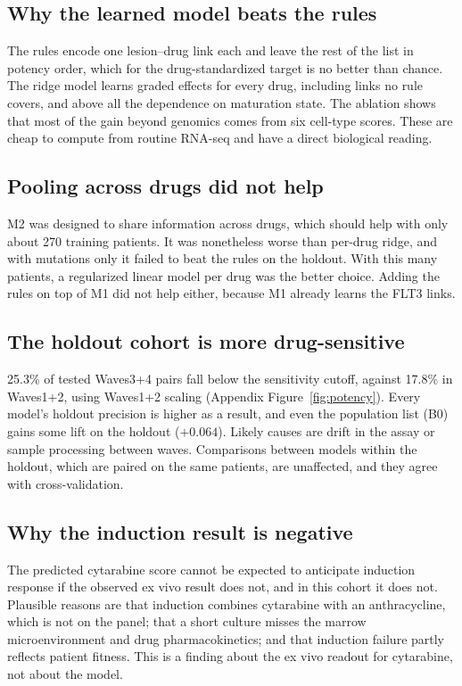 \documentclass[11pt,logo,nonumbering]{preprint}
\begin{document}
\subsection{Why the learned model beats the rules}
The rules encode one lesion--drug link each and leave the rest of the list in potency order, which for the drug-standardized target is no better than chance. The ridge model learns graded effects for every drug, including links no rule covers, and above all the dependence on maturation state. The ablation shows that most of the gain beyond genomics comes from six cell-type scores. These are cheap to compute from routine RNA-seq and have a direct biological reading.

\subsection{Pooling across drugs did not help}
M2 was designed to share information across drugs, which should help with only about 270 training patients. It was nonetheless worse than per-drug ridge, and with mutations only it failed to beat the rules on the holdout. With this many patients, a regularized linear model per drug was the better choice. Adding the rules on top of M1 did not help either, because M1 already learns the FLT3 links.

\subsection{The holdout cohort is more drug-sensitive}
25.3\% of tested Waves3+4 pairs fall below the sensitivity cutoff, against 17.8\% in Waves1+2, using Waves1+2 scaling (Appendix Figure~\ref{fig:potency}). Every model's holdout precision is higher as a result, and even the population list (B0) gains some lift on the holdout ($+0.064$). Likely causes are drift in the assay or sample processing between waves. Comparisons between models within the holdout, which are paired on the same patients, are unaffected, and they agree with cross-validation.

\subsection{Why the induction result is negative}
The predicted cytarabine score cannot be expected to anticipate induction response if the observed ex vivo result does not, and in this cohort it does not. Plausible reasons are that induction combines cytarabine with an anthracycline, which is not on the panel; that a short culture misses the marrow microenvironment and drug pharmacokinetics; and that induction failure partly reflects patient fitness. This is a finding about the ex vivo readout for cytarabine, not about the model.
\end{document}
